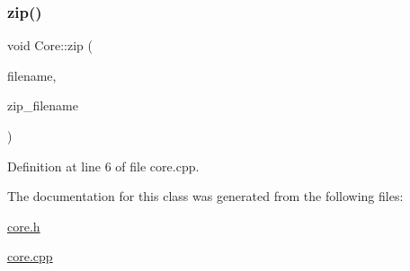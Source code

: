 \hypertarget{class_core_aa48d61e2fd30740e21ff228b8ee54dc1}{}\label{class_core_aa48d61e2fd30740e21ff228b8ee54dc1} 
\subsubsection{\texorpdfstring{zip()}{zip()}}
{\footnotesize\ttfamily void Core\+::zip (\begin{DoxyParamCaption}\item[{Q\+String}]{filename,  }\item[{Q\+String}]{zip\+\_\+filename }\end{DoxyParamCaption})}



Definition at line 6 of file core.\+cpp.



The documentation for this class was generated from the following files\+:\begin{DoxyCompactItemize}
\item 
\hyperlink{core_8h}{core.\+h}\item 
\hyperlink{core_8cpp}{core.\+cpp}\end{DoxyCompactItemize}

